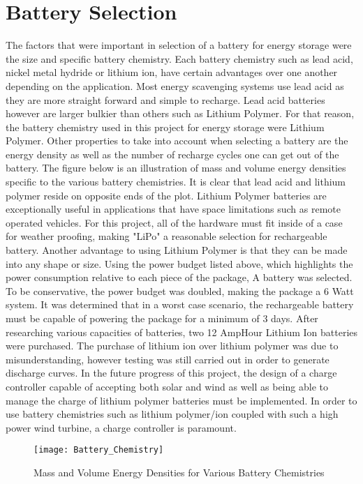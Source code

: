 \section{Battery Selection}
\indent The factors that were important in selection of a battery for energy storage were the size and specific battery chemistry. Each battery chemistry such as lead acid, nickel metal hydride or lithium ion, have certain advantages over one another depending on the application. Most energy scavenging systems use lead acid as they are more straight forward and simple to recharge. Lead acid batteries  however are larger bulkier than others such as Lithium Polymer. For that reason, the battery chemistry used in this project for energy storage were Lithium Polymer.  Other properties to take into account when selecting a battery are the energy density as well as the number of recharge cycles one can get out of the battery. The figure below is an illustration of mass and volume energy densities specific to the various battery chemistries. It is clear that lead acid and lithium polymer reside on opposite ends of the plot. 
\indent Lithium Polymer batteries are exceptionally useful in applications that have space limitations such as remote operated vehicles. For this project, all of the hardware must fit inside of a case for weather proofing, making "LiPo" a reasonable selection for rechargeable battery. Another advantage to using Lithium Polymer is that they can be made into any shape or size. 
\indent Using the power budget listed above, which highlights the power consumption relative to each piece of the package, A battery was selected. To be conservative, the power budget was doubled, making the package a 6 Watt system. It was determined that in a worst case scenario, the rechargeable battery must be capable of powering the package for a minimum of 3 days. After researching various capacities of batteries, two 12 AmpHour Lithium Ion batteries were purchased. The purchase of lithium ion over lithium polymer was due to misunderstanding, however testing was still carried out in order to generate discharge curves. In the future progress of this project, the design of a charge controller capable of accepting both solar and wind as well as being able to manage the charge of lithium polymer batteries must be implemented. In order to use battery chemistries such as lithium polymer/ion coupled with such a high power wind turbine, a charge controller is paramount. 

\begin{figure}
\centering
\texttt{[image: Battery\_Chemistry]}
\caption{Mass and Volume Energy Densities for Various Battery Chemistries}
\label{fig:Battery_Chemistry}
\end{figure}




